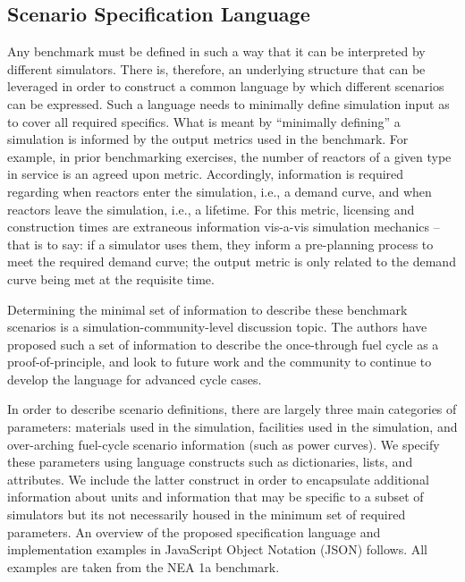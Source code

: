 \documentclass{anstrans}
\begin{document}
\subsection{Scenario Specification Language}
Any benchmark must be defined in such a way that it can be interpreted by
different simulators. There is, therefore, an underlying structure that can be
leveraged in order to construct a common language by which different scenarios
can be expressed. Such a language needs to minimally define simulation input as
to cover all required specifics. What is meant by ``minimally defining'' a
simulation is informed by the output metrics used in the benchmark. For example,
in prior benchmarking exercises, the number of reactors of a given type in
service is an agreed upon metric. Accordingly, information is required regarding
when reactors enter the simulation, i.e., a demand curve, and when reactors leave
the simulation, i.e., a lifetime. For this metric, licensing and construction
times are extraneous information vis-a-vis simulation mechanics -- that is to
say: if a simulator uses them, they inform a pre-planning process to meet the
required demand curve; the output metric is only related to the demand curve
being met at the requisite time.

Determining the minimal set of information to describe these benchmark scenarios
is a simulation-community-level discussion topic. The authors have proposed such
a set of information to describe the once-through fuel cycle as a
proof-of-principle, and look to future work and the community to continue to
develop the language for advanced cycle cases. 

In order to describe scenario definitions, there are largely three main
categories of parameters: materials used in the simulation, facilities used in
the simulation, and over-arching fuel-cycle scenario information (such as power
curves). We specify these parameters using language constructs such as
dictionaries, lists, and attributes. We include the latter construct in order to
encapsulate additional information about units and information that may be
specific to a subset of simulators but its not necessarily housed in the minimum
set of required parameters. An overview of the proposed specification
language and implementation examples in JavaScript Object Notation
(JSON)\cite{_json_2001} follows. All examples are taken from the NEA 1a
benchmark\cite{boucher_specification_2008}.
\end{document}
